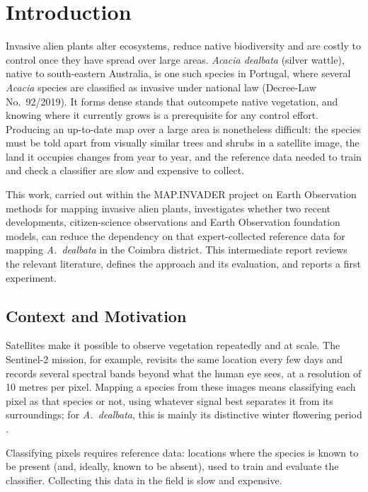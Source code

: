 \chapter{Introduction}
\label{sec:introduction}

Invasive alien plants alter ecosystems, reduce native biodiversity and
are costly to control once they have spread over large areas.
\emph{Acacia dealbata} (silver wattle), native to south-eastern
Australia, is one such species in Portugal, where several \emph{Acacia}
species are classified as invasive under national law (Decree-Law
No.~92/2019). It forms dense stands that outcompete native vegetation,
and knowing where it currently grows is a prerequisite for any control
effort. Producing an up-to-date map over a large area is nonetheless
difficult: the species must be told apart from visually similar trees
and shrubs in a satellite image, the land it occupies changes from
year to year, and the reference data needed to train and check a
classifier are slow and expensive to collect.

This work, carried out within the MAP.INVADER project on Earth
Observation methods for mapping invasive alien plants, investigates
whether two recent developments, citizen-science observations and
Earth Observation foundation models, can reduce the dependency on that
expert-collected reference data for mapping \emph{A.~dealbata} in the
Coimbra district. This intermediate report reviews the relevant
literature, defines the approach and its evaluation, and reports a
first experiment.

\section{Context and Motivation}
\label{sec:introduction-motivation}

Satellites make it possible to observe vegetation repeatedly and at
scale. The Sentinel-2 mission, for example, revisits the same location
every few days and records several spectral bands beyond what the
human eye sees, at a resolution of 10 metres per pixel. Mapping a
species from these images means classifying each pixel as that species
or not, using whatever signal best separates it from its surroundings;
for \emph{A.\ dealbata}, this is mainly its distinctive winter
flowering period \cite{domingo2023,martins2016}.

Classifying pixels requires reference data: locations where the
species is known to be present (and, ideally, known to be absent),
used to train and evaluate the classifier. Collecting this data in the
field is slow and expensive.

